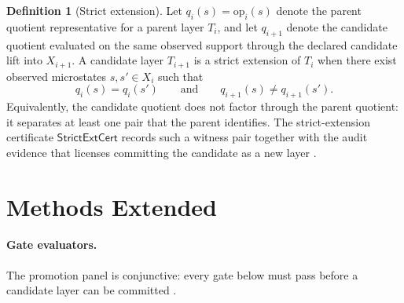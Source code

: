 \documentclass{article}
\newcommand{\Tlayer}[1]{T_{#1}}                    \newcommand{\Xspace}[1]{X_{#1}}                    \newcommand{\opmap}[1]{\mathrm{op}_{#1}}           \newcommand{\CDtau}{\mathrm{CD}_{\tau}}            \newcommand{\IDef}{\delta_{\tau,f}}                \newcommand{\strictcert}{\mathsf{StrictExtCert}}   \newcommand{\Kquot}{K}                             \newcommand{\Rquot}{R}
\theoremstyle{definition}
\newtheorem{definition}[theorem]{Definition}
\begin{document}
\begin{definition}[Strict extension]
Let \(q_i(s)=\opmap{i}(s)\) denote the parent quotient representative for a parent layer \(\Tlayer{i}\), and let \(q_{i+1}\) denote the candidate quotient evaluated on the same observed support through the declared candidate lift into \(\Xspace{i+1}\). A candidate layer \(\Tlayer{i+1}\) is a strict extension of \(\Tlayer{i}\) when there exist observed microstates \(s,s'\in \Xspace{i}\) such that
\[
q_i(s)=q_i(s')
\qquad\text{and}\qquad
q_{i+1}(s)\ne q_{i+1}(s').
\]
Equivalently, the candidate quotient does not factor through the parent quotient: it separates at least one pair that the parent identifies. The strict-extension certificate \(\strictcert\) records such a witness pair together with the audit evidence that licenses committing the candidate as a new layer \cite{Tsiokos2026CantorShell}.
\end{definition}
 \section{Methods Extended}\label{app:methods}

\paragraph{Gate evaluators.}
The promotion panel is conjunctive: every gate below must pass before a candidate layer can be committed \cite{Tsiokos2026FoundationsIII}.
\end{document}
